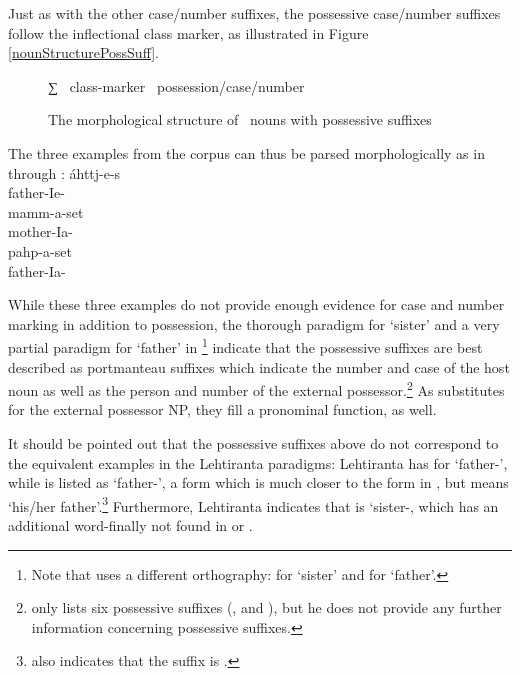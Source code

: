 Just as with the other case/number suffixes, the possessive case/number suffixes follow the inflectional class marker, as illustrated in Figure \vref{nounStructurePossSuff}. %
\begin{figure}[h]\centering
∑ \PLUS\ class-marker \PLUS\ possession/case/number%
\caption{The morphological structure of \PS\ nouns with possessive suffixes}\label{nounStructurePossSuff}
\end{figure}

The three examples from the corpus can thus be parsed morphologically as in  through :
\ea\label{possSuffixParse1}
\gll	áhttj-e-s\\
	father-Ie-\\\nopagebreak
{}
\z
\ea\label{possSuffixParse2}
\gll	mamm-a-set\\
	mother-Ia-\\\nopagebreak
{}
\z
\ea\label{possSuffixParse3}
\gll	pahp-a-set\\
	father-Ia-\\\nopagebreak
{}
\z

While these three examples do not provide enough evidence for case and number marking in addition to possession, the thorough paradigm for  ‘sister’ and a very partial paradigm for  ‘father’ in \citet[158-159]{Lehtiranta1992}\footnote{Note that \citet{Lehtiranta1992} uses a different orthography:  for ‘sister’ and  for ‘father’.} indicate that the possessive suffixes are best described as portmanteau suffixes which indicate the number and case of the host noun as well as the person and number of the external possessor.\footnote{\citet[110]{Lagercrantz1926} only lists six possessive suffixes (,  and ), but he does not provide any further information concerning possessive suffixes.}
As substitutes for the external possessor NP, they fill a pronominal function, as well. %

It should be pointed out that the possessive suffixes above do not correspond to the equivalent examples in the Lehtiranta paradigms: Lehtiranta has  for ‘father-’, while  is listed as ‘father-’, a form which is much closer to the form in , but means ‘his/her father’.\footnote{\citet[110]{Lagercrantz1926} also indicates that the  suffix is .} 
Furthermore, Lehtiranta indicates that  is ‘sister-, which has an additional  word-finally not found in  or . 

